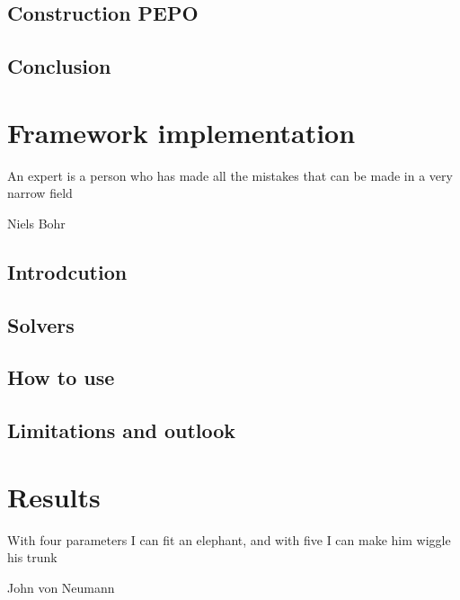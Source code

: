 \documentclass{book}
\newcounter{a}
\newcounter{b}
\begin{document}
\section{Construction PEPO}


\section{Conclusion}


\chapter{Framework implementation}\label{chap5}


\epigraph{An expert is a person who has made all the mistakes that can be made in a very narrow field}{Niels Bohr}

\section{Introdcution}


\section{Solvers} \label{sec:framework_impl}


\section{How to use}


\section{Limitations and outlook}


\chapter{Results} \label{chap:results}

\epigraph{With four parameters I can fit an elephant, and with five I can make him wiggle his trunk}{John von Neumann}

%
\end{document}
